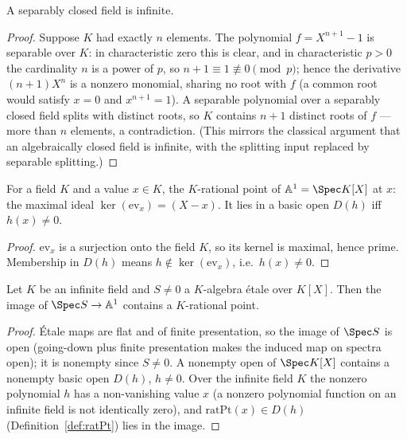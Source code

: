 \begin{lemma}
  \label{lem:sepClosed_infinite}
  \leanok
  A separably closed field is infinite.
\end{lemma}
\begin{proof}
  \leanok
  Suppose \(K\) had exactly \(n\) elements. The polynomial \(f = X^{n+1} - 1\) is separable
  over \(K\): in characteristic zero this is clear, and in characteristic \(p > 0\) the
  cardinality \(n\) is a power of \(p\), so \(n + 1 \equiv 1 \not\equiv 0 \pmod p\); hence
  the derivative \((n+1)X^{n}\) is a nonzero monomial, sharing no root with \(f\) (a common
  root would satisfy \(x = 0\) and \(x^{n+1} = 1\)). A separable polynomial over a separably
  closed field splits with distinct roots, so \(K\) contains \(n + 1\) distinct roots of
  \(f\) — more than \(n\) elements, a contradiction. (This mirrors the classical argument
  that an algebraically closed field is infinite, with the splitting input replaced by
  separable splitting.)
\end{proof}

\begin{definition}
  \label{def:ratPt}
  \leanok
  For a field \(K\) and a value \(x \in K\), the \(K\)-rational point of
  \(\mathbb{A}^1 = \Spec K[X]\) at \(x\): the maximal ideal \(\ker(\mathrm{ev}_x) = (X - x)\). It
  lies in a basic open \(D(h)\) iff \(h(x) \neq 0\).
\end{definition}
\begin{proof}
  \leanok
  \(\mathrm{ev}_x\) is a surjection onto the field \(K\), so its kernel is maximal, hence
  prime. Membership in \(D(h)\) means \(h \notin \ker(\mathrm{ev}_x)\), i.e.\
  \(h(x) \neq 0\).
\end{proof}

\begin{lemma}
  \label{lem:exists_ratPt_mem_range}
  \uses{def:ratPt, lem:sepClosed_infinite}
  \leanok
  Let \(K\) be an infinite field and \(S \neq 0\) a \(K\)-algebra \'etale over
  \(K[X]\). Then the image of \(\Spec S \to \mathbb{A}^1\) contains a \(K\)-rational point.
\end{lemma}
\begin{proof}
  \leanok
  \'Etale maps are flat and of finite presentation, so the image of \(\Spec S\) is open
  (going-down plus finite presentation makes the induced map on spectra open); it is
  nonempty since \(S \neq 0\). A nonempty open of \(\Spec K[X]\) contains a nonempty basic
  open \(D(h)\), \(h \neq 0\). Over the infinite field \(K\) the nonzero polynomial \(h\)
  has a non-vanishing value \(x\) (a nonzero polynomial function on an infinite field is
  not identically zero), and \(\mathrm{ratPt}(x) \in D(h)\)
  (Definition~\ref{def:ratPt}) lies in the image.
\end{proof}

